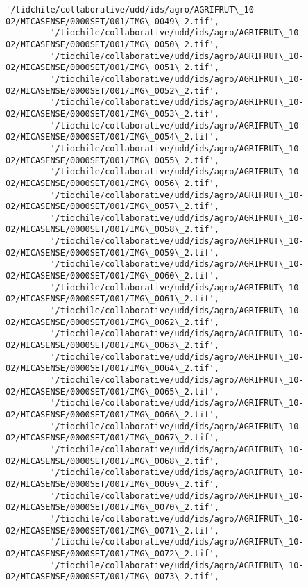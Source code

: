 \documentclass[11pt]{article}
\begin{document}
\begin{Verbatim}[commandchars=\\\{\}]
         '/tidchile/collaborative/udd/ids/agro/AGRIFRUT\_10-02/MICASENSE/0000SET/001/IMG\_0049\_2.tif',
         '/tidchile/collaborative/udd/ids/agro/AGRIFRUT\_10-02/MICASENSE/0000SET/001/IMG\_0050\_2.tif',
         '/tidchile/collaborative/udd/ids/agro/AGRIFRUT\_10-02/MICASENSE/0000SET/001/IMG\_0051\_2.tif',
         '/tidchile/collaborative/udd/ids/agro/AGRIFRUT\_10-02/MICASENSE/0000SET/001/IMG\_0052\_2.tif',
         '/tidchile/collaborative/udd/ids/agro/AGRIFRUT\_10-02/MICASENSE/0000SET/001/IMG\_0053\_2.tif',
         '/tidchile/collaborative/udd/ids/agro/AGRIFRUT\_10-02/MICASENSE/0000SET/001/IMG\_0054\_2.tif',
         '/tidchile/collaborative/udd/ids/agro/AGRIFRUT\_10-02/MICASENSE/0000SET/001/IMG\_0055\_2.tif',
         '/tidchile/collaborative/udd/ids/agro/AGRIFRUT\_10-02/MICASENSE/0000SET/001/IMG\_0056\_2.tif',
         '/tidchile/collaborative/udd/ids/agro/AGRIFRUT\_10-02/MICASENSE/0000SET/001/IMG\_0057\_2.tif',
         '/tidchile/collaborative/udd/ids/agro/AGRIFRUT\_10-02/MICASENSE/0000SET/001/IMG\_0058\_2.tif',
         '/tidchile/collaborative/udd/ids/agro/AGRIFRUT\_10-02/MICASENSE/0000SET/001/IMG\_0059\_2.tif',
         '/tidchile/collaborative/udd/ids/agro/AGRIFRUT\_10-02/MICASENSE/0000SET/001/IMG\_0060\_2.tif',
         '/tidchile/collaborative/udd/ids/agro/AGRIFRUT\_10-02/MICASENSE/0000SET/001/IMG\_0061\_2.tif',
         '/tidchile/collaborative/udd/ids/agro/AGRIFRUT\_10-02/MICASENSE/0000SET/001/IMG\_0062\_2.tif',
         '/tidchile/collaborative/udd/ids/agro/AGRIFRUT\_10-02/MICASENSE/0000SET/001/IMG\_0063\_2.tif',
         '/tidchile/collaborative/udd/ids/agro/AGRIFRUT\_10-02/MICASENSE/0000SET/001/IMG\_0064\_2.tif',
         '/tidchile/collaborative/udd/ids/agro/AGRIFRUT\_10-02/MICASENSE/0000SET/001/IMG\_0065\_2.tif',
         '/tidchile/collaborative/udd/ids/agro/AGRIFRUT\_10-02/MICASENSE/0000SET/001/IMG\_0066\_2.tif',
         '/tidchile/collaborative/udd/ids/agro/AGRIFRUT\_10-02/MICASENSE/0000SET/001/IMG\_0067\_2.tif',
         '/tidchile/collaborative/udd/ids/agro/AGRIFRUT\_10-02/MICASENSE/0000SET/001/IMG\_0068\_2.tif',
         '/tidchile/collaborative/udd/ids/agro/AGRIFRUT\_10-02/MICASENSE/0000SET/001/IMG\_0069\_2.tif',
         '/tidchile/collaborative/udd/ids/agro/AGRIFRUT\_10-02/MICASENSE/0000SET/001/IMG\_0070\_2.tif',
         '/tidchile/collaborative/udd/ids/agro/AGRIFRUT\_10-02/MICASENSE/0000SET/001/IMG\_0071\_2.tif',
         '/tidchile/collaborative/udd/ids/agro/AGRIFRUT\_10-02/MICASENSE/0000SET/001/IMG\_0072\_2.tif',
         '/tidchile/collaborative/udd/ids/agro/AGRIFRUT\_10-02/MICASENSE/0000SET/001/IMG\_0073\_2.tif',

\end{Verbatim}
\end{document}
